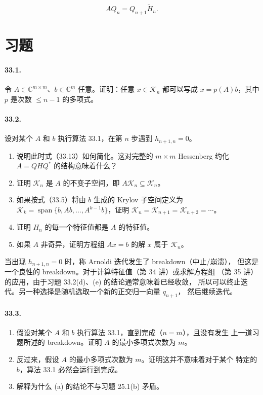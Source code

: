 \documentclass[UTF8,fontset=none,12pt]{ctexart}
\begin{document}
\begin{equation}
AQ_n=Q_{n+1}\widetilde H_n.
\tag{33.13}
\end{equation}

\section*{习题}

\paragraph{33.1.}
令 $A\in\mathbb C^{m\times m}$、$b\in\mathbb C^m$ 任意。证明：任意
$x\in\mathcal K_n$ 都可以写成 $x=p(A)b$，其中 $p$ 是次数 $\le n-1$ 的多项式。

\paragraph{33.2.}
设对某个 $A$ 和 $b$ 执行算法 33.1，在第 $n$ 步遇到
$h_{n+1,n}=0$。

\begin{enumerate}[label=(\alph*)]
\item 说明此时式（33.13）如何简化。这对完整的 $m\times m$ Hessenberg
约化 $A=QHQ^*$ 的结构意味着什么？
\item 证明 $\mathcal K_n$ 是 $A$ 的不变子空间，即 $A\mathcal K_n\subseteq\mathcal K_n$。
\item 如果按式（33.5）将由 $b$ 生成的 Krylov 子空间定义为
  $\mathcal K_k=\operatorname{span}\{b,Ab,\ldots,A^{k-1}b\}$，证明
  $\mathcal K_n=\mathcal K_{n+1}=\mathcal K_{n+2}=\cdots$。
\item 证明 $H_n$ 的每一个特征值都是 $A$ 的特征值。
\item 如果 $A$ 非奇异，证明方程组 $Ax=b$ 的解 $x$ 属于 $\mathcal K_n$。
\end{enumerate}

当出现 $h_{n+1,n}=0$ 时，称 Arnoldi 迭代发生了 breakdown（中止/崩溃），
但这是一个良性的 breakdown。对于计算特征值（第 34 讲）或求解方程组
（第 35 讲）的应用，由于习题 33.2(d)、(e) 的结论通常意味着已经收敛，
所以可以终止迭代。另一种选择是随机选取一个新的正交归一向量 $q_{n+1}$，
然后继续迭代。

\paragraph{33.3.}
\begin{enumerate}[label=(\alph*)]
\item 假设对某个 $A$ 和 $b$ 执行算法 33.1，直到完成（$n=m$），且没有发生
  上一道习题所述的 breakdown。证明 $A$ 的最小多项式次数为 $m$。
\item 反过来，假设 $A$ 的最小多项式次数为 $m$。证明这并不意味着对于某个
  特定的 $b$，算法 33.1 必然会运行到完成。
\item 解释为什么 (a) 的结论不与习题 25.1(b) 矛盾。
\end{enumerate}
\end{document}

